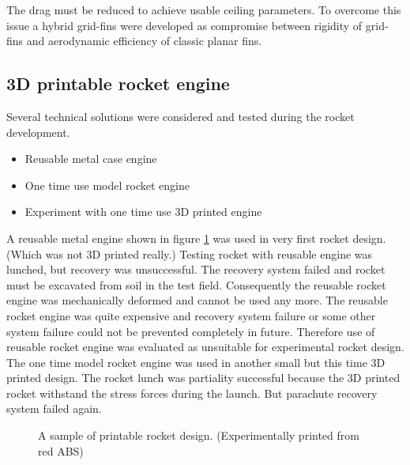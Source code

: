 \documentclass{poster16}
\begin{document}
The drag must be reduced to achieve usable ceiling parameters. To overcome this issue a hybrid grid-fins were developed as compromise between rigidity of grid-fins and aerodynamic efficiency of classic planar fins. 


\subsection{3D printable rocket engine}

Several technical solutions were considered and tested during the rocket development. 

\begin{itemize}
\item Reusable metal case engine
\item One time use model rocket engine
\item Experiment with one time use 3D printed engine
\end{itemize}

A reusable metal engine shown in figure \ref{fig:metal_engine} was used in very first rocket design. (Which was not 3D printed really.) Testing rocket with reusable engine was lunched, but recovery was unsuccessful. The recovery system failed and rocket must be excavated from soil in the test field. Consequently the reusable rocket engine was mechanically deformed and cannot be used any more.
The reusable rocket engine was quite expensive and recovery system failure or some other system failure could not be prevented completely in future. Therefore use of reusable rocket engine was evaluated as unsuitable for experimental rocket design. 
The one time model rocket engine was used in another small but this time 3D printed design. The rocket lunch was partiality successful because the 3D printed rocket withstand the stress forces during the launch.  But parachute recovery system failed again. 

\begin{figure}[ht]
\begin{center}
\caption{A sample of printable rocket design. (Experimentally printed from red ABS)} 
\label{fig:metal_engine}
\end{center}
\end{figure}
\end{document}
